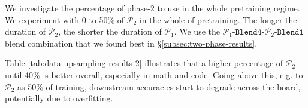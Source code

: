 \documentclass[11pt]{article}
\newcommand{\todo}[1]{{\color{red}\bf [TODO: #1]}\xspace}
\newcommand{\shrimai}[1]{{\color{purple}\bf\small [Shrimai: #1]}\xspace}
\newcommand{\phaseone}{$\mathcal{P}_1$\xspace}
\newcommand{\phasetwo}{$\mathcal{P}_2$\xspace}
\newcommand{\ponebfourptwobone}{\phaseone-$\mathtt{Blend4}$-\phasetwo-$\mathtt{Blend1}$\xspace}
\begin{document}
We investigate the percentage of phase-2 to use in the whole pretraining regime. 
We experiment with 0 to 50\% of \phasetwo in the whole of pretraining.
The longer the duration of \phasetwo, the shorter the duration of \phaseone.
We use the \ponebfourptwobone blend combination that we found best in \S\ref{subsec:two-phase-results}.


Table \ref{tab:data-upsampling-results-2} illustrates that a higher percentage of \phasetwo until 40\% is better overall, especially in math and code.
Going above this, e.g. to \phasetwo as 50\% of training, downstream accuracies start to degrade across the board, potentially due to overfitting. 



\end{document}
